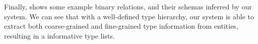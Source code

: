 

%
%
%
%
%
%

Finally,  shows some example binary relations,
and their schemas inferred by our system.  We can see that
with a well-defined type hierarchy, our system is able to extract both
coarse-grained and fine-grained type information from entities,
resulting in a informative type lists.


